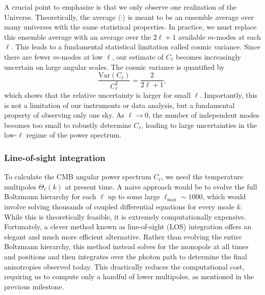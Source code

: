 \documentclass{aa}
\numberwithin{equation}{section}
\numberwithin{table}{section}
\numberwithin{figure}{section}
\begin{document}
A crucial point to emphasize is that we only observe one realization of the Universe. Theoretically, the average $\langle \cdot \rangle$ is meant to be an ensemble average over many universes with the same statistical properties. In practice, we must replace this ensemble average with an average over the $2\ell + 1$ available $m$-modes at each $\ell$. This leads to a fundamental statistical limitation called cosmic variance. Since there are fewer $m$-modes at low $\ell$, our estimate of $C_\ell$ becomes increasingly uncertain on large angular scales. The cosmic variance is quantified by  
\begin{equation}
\frac{\mathrm{Var}(C_\ell)}{C_\ell^2} = \frac{2}{2\ell + 1}, \label{eq: variance}
\end{equation}
which shows that the relative uncertainty is larger for small $\ell$. Importantly, this is not a limitation of our instruments or data analysis, but a fundamental property of observing only one sky. As $\ell \to 0$, the number of independent modes becomes too small to robustly determine $C_\ell$, leading to large uncertainties in the low-$\ell$ regime of the power spectrum.








\subsubsection{Line-of-sight integration}\label{subsubsec: IV theory LOS}
To calculate the CMB angular power spectrum $C_\ell$, we need the temperature multipoles $\Theta_\ell(k)$ at present time. A naive approach would be to evolve the full Boltzmann hierarchy for each $\ell$ up to some large $\ell_{\text{max}} \sim 1000$, which would involve solving thousands of coupled differential equations for every mode $k$. While this is theoretically feasible, it is extremely computationally expensive. Fortunately, a clever method known as line-of-sight (LOS) integration \citep[see][]{LOS} offers an elegant and much more efficient alternative.
Rather than evolving the entire Boltzmann hierarchy, this method instead solves for the monopole at all times and positions and then integrates over the photon path to determine the final anisotropies observed today. This drastically reduces the computational cost, requiring us to compute only a handful of lower multipoles, as mentioned in the previous milestone. 
\end{document}
